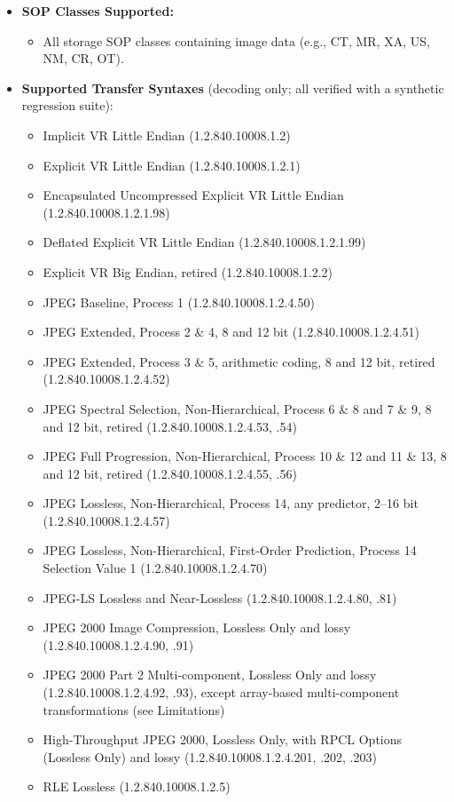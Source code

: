 \documentclass[11pt]{article}
\begin{document}
\begin{itemize}
  \item \textbf{SOP Classes Supported:}
  \begin{itemize}
    \item All storage SOP classes containing image data (e.g., CT, MR, XA, US, NM, CR, OT).
  \end{itemize}
  
  \item \textbf{Supported Transfer Syntaxes} (decoding only; all verified with a synthetic regression suite):
  \begin{itemize}
    \item Implicit VR Little Endian (1.2.840.10008.1.2)
    \item Explicit VR Little Endian (1.2.840.10008.1.2.1)
    \item Encapsulated Uncompressed Explicit VR Little Endian (1.2.840.10008.1.2.1.98)
    \item Deflated Explicit VR Little Endian (1.2.840.10008.1.2.1.99)
    \item Explicit VR Big Endian, retired (1.2.840.10008.1.2.2)
    \item JPEG Baseline, Process 1 (1.2.840.10008.1.2.4.50)
    \item JPEG Extended, Process 2 \& 4, 8 and 12 bit (1.2.840.10008.1.2.4.51)
    \item JPEG Extended, Process 3 \& 5, arithmetic coding, 8 and 12 bit, retired (1.2.840.10008.1.2.4.52)
    \item JPEG Spectral Selection, Non-Hierarchical, Process 6 \& 8 and 7 \& 9, 8 and 12 bit, retired (1.2.840.10008.1.2.4.53, .54)
    \item JPEG Full Progression, Non-Hierarchical, Process 10 \& 12 and 11 \& 13, 8 and 12 bit, retired (1.2.840.10008.1.2.4.55, .56)
    \item JPEG Lossless, Non-Hierarchical, Process 14, any predictor, 2--16 bit (1.2.840.10008.1.2.4.57)
    \item JPEG Lossless, Non-Hierarchical, First-Order Prediction, Process 14 Selection Value 1 (1.2.840.10008.1.2.4.70)
    \item JPEG-LS Lossless and Near-Lossless (1.2.840.10008.1.2.4.80, .81)
    \item JPEG 2000 Image Compression, Lossless Only and lossy (1.2.840.10008.1.2.4.90, .91)
    \item JPEG 2000 Part 2 Multi-component, Lossless Only and lossy (1.2.840.10008.1.2.4.92, .93), except array-based multi-component transformations (see Limitations)
    \item High-Throughput JPEG 2000, Lossless Only, with RPCL Options (Lossless Only) and lossy (1.2.840.10008.1.2.4.201, .202, .203)
    \item RLE Lossless (1.2.840.10008.1.2.5)
  \end{itemize}


\end{itemize}
\end{document}
